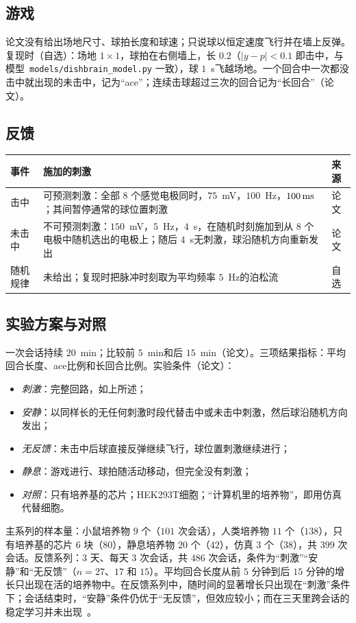 \subsection*{游戏}

论文没有给出场地尺寸、球拍长度和球速；只说球以恒定速度飞行并在墙上反弹。复现时（自选）：场地 $1\times1$，球拍在右侧墙上，长 $0.2$（$|y-p|<0.1$ 即击中，与模型~\texttt{models/dishbrain\_model.py} 一致），球 $1$~s飞越场地。一个回合中一次都没击中就出现的未击中，记为“ace”；连续击球超过三次的回合记为“长回合”（论文）。

\subsection*{反馈}

\begin{center}
\footnotesize
\setlength{\tabcolsep}{4pt}
\renewcommand{\arraystretch}{1.15}
\begin{tabular}{>{\raggedright}p{2.6cm}>{\raggedright}p{8.3cm}>{\raggedright\arraybackslash}p{1.6cm}}
\toprule
事件 & 施加的刺激 & 来源 \\
\midrule
击中 & 可预测刺激：全部 $8$ 个感觉电极同时，$75$~mV，$100$~Hz，$100\,\text{ms}$；其间暂停通常的球位置刺激 & 论文 \\
未击中 & 不可预测刺激：$150$~mV，$5$~Hz，$4$~s，在随机时刻施加到从 $8$ 个电极中随机选出的电极上；随后 $4$~s无刺激，球沿随机方向重新发出 & 论文 \\
随机规律 & 未给出；复现时把脉冲时刻取为平均频率 $5$~Hz的泊松流 & 自选 \\
\bottomrule
\end{tabular}
\end{center}

\subsection*{实验方案与对照}

一次会话持续 $20$~min；比较前 $5$~min和后 $15$~min（论文）。三项结果指标：平均回合长度、ace比例和长回合比例。实验条件（论文）：
\begin{itemize}
\item \emph{刺激}：完整回路，如上所述；
\item \emph{安静}：以同样长的无任何刺激时段代替击中或未击中刺激，然后球沿随机方向发出；
\item \emph{无反馈}：未击中后球直接反弹继续飞行，球位置刺激继续进行；
\item \emph{静息}：游戏进行、球拍随活动移动，但完全没有刺激；
\item \emph{对照}：只有培养基的芯片；HEK293T细胞；“计算机里的培养物”，即用仿真代替细胞。
\end{itemize}
主系列的样本量：小鼠培养物 $9$ 个（$101$ 次会话），人类培养物 $11$ 个（$138$），只有培养基的芯片 $6$ 块（$80$），静息培养物 $20$ 个（$42$），仿真 $3$ 个（$38$），共 $399$ 次会话。反馈系列：$3$ 天、每天 $3$ 次会话，共 $486$ 次会话，条件为“刺激”“安静”和“无反馈”（$n=27$、$17$ 和 $15$）。平均回合长度从前 $5$ 分钟到后 $15$ 分钟的增长只出现在活的培养物中。在反馈系列中，随时间的显著增长只出现在“刺激”条件下；会话结束时，“安静”条件仍优于“无反馈”，但效应较小；而在三天里跨会话的稳定学习并未出现~\cite{Kagan2022}。

